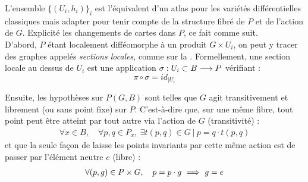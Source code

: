 L'ensemble $\big\{(U_i, h_i)\big\}_i$ est l'équivalent d'un atlas pour les variétés différentielles classiques mais adapter pour tenir compte de la structure fibré de $P$ et de l'action de $G$. Explicité les changements de cartes dans $P$, ce fait comme suit.
\\
D'abord, $P$ étant localement difféomorphe à un produit $G\times U_i$, on peut y tracer des graphes appelés \emph{sections locales}, comme sur la  . Formellement, une section locale au dessus  de $U_i$ est une application $\sigma : U_i\subset B\longrightarrow P$ vérifiant :
\[\pi\circ \sigma = id_{{\displaystyle |}U_i}\]
\begin{figure}[H]
	\begin{floatrow}
	
\end{floatrow}
\end{figure}
\noindent
Ensuite, les hypothèses sur $P(G,B)$ sont telles que $G$ agit transitivement et librement (ou sans point fixe) sur $P$. C'est-à-dire que, sur une même fibre, tout point peut être atteint par tout autre via l'action de $G$ (transitivité) :
\begin{align*}
	\forall x\in B,\quad \forall p,q\in P_x,\ \exists t(p,q)\in G\ |\ p = q\cdot t(p,q) 
\end{align*}
et que la seule façon de laisse les points invariants par cette même action est de passer par l'élément neutre $e$ (libre) :
\begin{align*}
	\forall (p,g)\in P\times G,\quad p = p\cdot g\ \Longrightarrow\ g=e
\end{align*}
